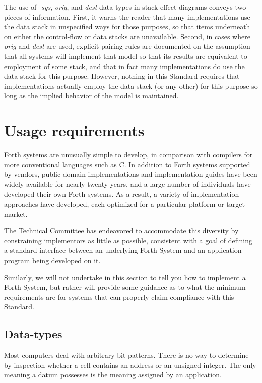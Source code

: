 The use of \emph{-sys}, \emph{orig}, and \emph{dest} data types in
stack effect diagrams conveys two pieces of information. First, it
warns the reader that many implementations use the data stack in
unspecified ways for those purposes, so that items underneath on
either the control-flow or data stacks are unavailable. Second, in
cases where \emph{orig} and \emph{dest} are used, explicit pairing
rules are documented on the assumption that all systems will
implement that model so that its results are equivalent to employment
of some stack, and that in fact many implementations do use the data
stack for this purpose. However, nothing in this Standard requires
that implementations actually employ the data stack (or any other)
for this purpose so long as the implied behavior of the model is
maintained.


\section{Usage requirements} %

Forth systems are unusually simple to develop, in comparison with
compilers for more conventional languages such as C. In addition to
Forth systems supported by vendors, public-domain implementations and
implementation guides have been widely available for nearly twenty
years, and a large number of individuals have developed their own
Forth systems. As a result, a variety of implementation approaches
have developed, each optimized for a particular platform or target
market.

The  Technical Committee has endeavored to accommodate this
diversity by constraining implementors as little as possible,
consistent with a goal of defining a standard interface between an
underlying Forth System and an application program being developed
on it.

Similarly, we will not undertake in this section to tell you how to
implement a Forth System, but rather will provide some guidance as
to what the minimum requirements are for systems that can properly
claim compliance with this Standard.

\subsection{Data-types} %
\label{rat:types}

Most computers deal with arbitrary bit patterns. There is no way to
determine by inspection whether a cell contains an address or an
unsigned integer. The only meaning a datum possesses is the meaning
assigned by an application.


